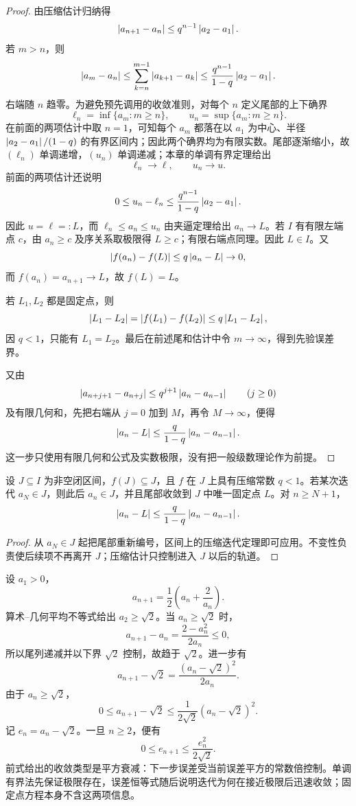 \begin{proof}
由压缩估计归纳得
\[
 \left|a_{n+1}-a_n\right|\le q^{n-1}\left|a_2-a_1\right|.
\]
若 \(m>n\)，则
\[
 \left|a_m-a_n\right|
 \le\sum_{k=n}^{m-1}\left|a_{k+1}-a_k\right|
 \le\frac{q^{n-1}}{1-q}\left|a_2-a_1\right|.
\]
右端随 \(n\) 趋零。为避免预先调用的收敛准则，对每个 \(n\) 定义尾部的上下确界
\[
 \ell_n=\inf\{a_m:m\ge n\},\qquad
 u_n=\sup\{a_m:m\ge n\}.
\]
在前面的两项估计中取 \(n=1\)，可知每个 \(a_m\) 都落在以 \(a_1\) 为中心、半径
\(\left|a_2-a_1\right|/(1-q)\) 的有界区间内；因此两个确界均为有限实数。尾部逐渐缩小，故 \((\ell_n)\) 单调递增，\((u_n)\) 单调递减；本章的单调有界定理给出
\[
 \ell_n\to \ell,\qquad u_n\to u.
\]
前面的两项估计还说明
\[
 0\le u_n-\ell_n
 \le \frac{q^{n-1}}{1-q}\left|a_2-a_1\right|.
\]
因此 \(u=\ell=:L\)，而 \(\ell_n\le a_n\le u_n\) 由夹逼定理给出 \(a_n\to L\)。若 \(I\) 有有限左端点 \(c\)，由 \(a_n\ge c\) 及序关系取极限得 \(L\ge c\)；有限右端点同理。因此 \(L\in I\)。又
\[
 \left|f(a_n)-f(L)\right|\le q\left|a_n-L\right|\to0,
\]
而 \(f(a_n)=a_{n+1}\to L\)，故 \(f(L)=L\)。

若 \(L_1,L_2\) 都是固定点，则
\[
 \left|L_1-L_2\right|=\left|f(L_1)-f(L_2)\right|
 \le q\left|L_1-L_2\right|,
\]
因 \(q<1\)，只能有 \(L_1=L_2\)。最后在前述尾和估计中令 \(m\to\infty\)，得到先验误差界。

又由
\[
 \left|a_{n+j+1}-a_{n+j}\right|
 \le q^{j+1}\left|a_n-a_{n-1}\right|\qquad(j\ge0)
\]
及有限几何和，先把右端从 \(j=0\) 加到 \(M\)，再令 \(M\to\infty\)，便得
\[
 \left|a_n-L\right|
 \le\frac q{1-q}\left|a_n-a_{n-1}\right|.
\]
这一步只使用有限几何和公式及实数极限，没有把一般级数理论作为前提。
\end{proof}

\begin{proposition}[局部压缩的启动条件]
设 \(J\subseteq I\) 为非空闭区间，\(f(J)\subseteq J\)，且 \(f\) 在
\(J\) 上具有压缩常数 \(q<1\)。若某次迭代 \(a_N\in J\)，则此后
\(a_n\in J\)，并且尾部收敛到 \(J\) 中唯一固定点 \(L\)。对 \(n\ge N+1\)，
\[
 \left|a_n-L\right|\le\frac q{1-q}\left|a_n-a_{n-1}\right|.
\]
\end{proposition}

\begin{proof}
从 \(a_N\in J\) 起把尾部重新编号，区间上的压缩迭代定理即可应用。不变性负责使后续项不再离开 \(J\)；压缩估计只控制进入 \(J\) 以后的轨道。
\end{proof}

\begin{example}[Heron 迭代]
设 \(a_1>0\)，
\[
 a_{n+1}=\frac12\left(a_n+\frac2{a_n}\right).
\]
算术--几何平均不等式给出 \(a_2\ge\sqrt2\)。当 \(a_n\ge\sqrt2\) 时，
\[
 a_{n+1}-a_n=\frac{2-a_n^2}{2a_n}\le0,
\]
所以尾列递减并以下界 \(\sqrt2\) 控制，故趋于 \(\sqrt2\)。进一步有
\[
 a_{n+1}-\sqrt2
 =\frac{(a_n-\sqrt2)^2}{2a_n}.
\]
由于 \(a_n\ge\sqrt2\)，
\[
 0\le a_{n+1}-\sqrt2
 \le\frac1{2\sqrt2}(a_n-\sqrt2)^2.
\]
记 \(e_n=a_n-\sqrt2\)。一旦 \(n\ge2\)，便有
\[
 0\le e_{n+1}\le \frac{e_n^2}{2\sqrt2}.
\]
前式给出的收敛类型是平方衰减：下一步误差受当前误差平方的常数倍控制。单调有界法先保证极限存在，误差恒等式随后说明迭代为何在接近极限后迅速收敛；固定点方程本身不含这两项信息。
\end{example}


